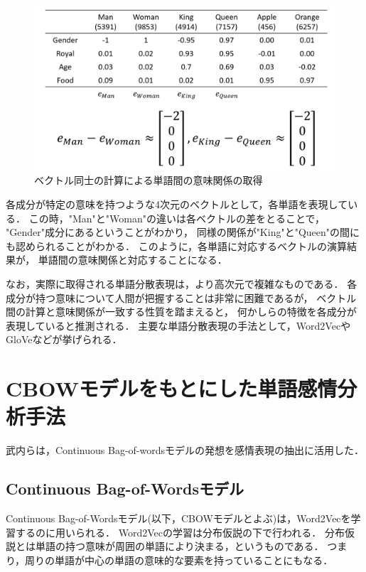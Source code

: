 		\begin{figure}[H]
			\centering
			\includegraphics[width=\linewidth]{./figure/word2vec.png}
			\caption{ベクトル同士の計算による単語間の意味関係の取得}
			\label{fig:word2vec}
		\end{figure}

		各成分が特定の意味を持つような4次元のベクトルとして，各単語を表現している．
		この時，"Man"と"Woman"の違いは各ベクトルの差をとることで，
		"Gender"成分にあるということがわかり，
		同様の関係が"King"と"Queen"の間にも認められることがわかる．
		このように，各単語に対応するベクトルの演算結果が，
		単語間の意味関係と対応することになる．
		
		なお，実際に取得される単語分散表現は，より高次元で複雑なものである．
		各成分が持つ意味について人間が把握することは非常に困難であるが，
		ベクトル間の計算と意味関係が一致する性質を踏まえると，
		何かしらの特徴を各成分が表現していると推測される．
		主要な単語分散表現の手法として，Word2Vec\cite{word2vec}やGloVe\cite{glove}などが挙げられる．

\section{CBOWモデルをもとにした単語感情分析手法}
	武内ら\cite{takeuchi}は，Continuous Bag-of-wordsモデルの発想を感情表現の抽出に活用した．

	\subsection{Continuous Bag-of-Wordsモデル}
	Continuous Bag-of-Wordsモデル\cite{word2vec}(以下，CBOWモデルとよぶ)は，Word2Vecを学習するのに用いられる．
	Word2Vecの学習は分布仮説の下で行われる．
	分布仮説とは単語の持つ意味が周囲の単語により決まる，というものである．
	つまり，周りの単語が中心の単語の意味的な要素を持っていることにもなる．

